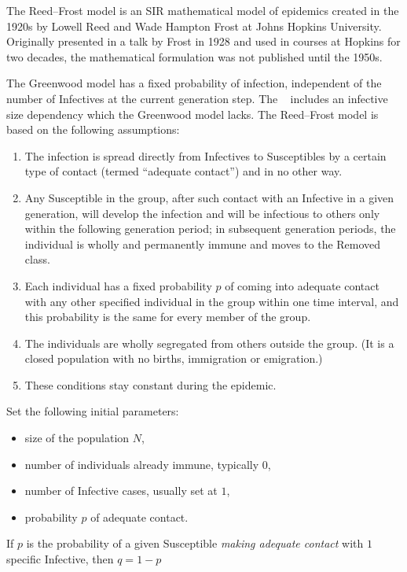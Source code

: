 \documentclass[12pt]{article}
\begin{document}
The Reed–Frost model is an SIR mathematical model of epidemics created
in the 1920s by Lowell Reed and Wade Hampton Frost at Johns Hopkins
University. Originally presented in a talk by Frost in 1928 and used in
courses at Hopkins for two decades, the mathematical formulation was not
published until the 1950s.

The Greenwood model has a fixed probability of infection, independent of
the number of Infectives at the current generation step.  The ~%
includes an infective size dependency which the Greenwood model lacks.
The Reed–Frost model is based on the following assumptions:
\begin{enumerate}
    \item
        The infection is spread directly from Infectives to Susceptibles
        by a certain type of contact (termed ``adequate contact'') and
        in no other way.
    \item
        Any Susceptible in the group, after such contact with an
        Infective in a given generation, will develop the infection and
        will be infectious to others only within the following
        generation period; in subsequent generation periods, the
        individual is wholly and permanently immune and moves to the
        Removed class.
    \item
        Each individual has a fixed probability \( p \) of coming into
        adequate contact with any other specified individual in the
        group within one time interval, and this probability is the same
        for every member of the group.
    \item
        The individuals are wholly segregated from others outside the
        group.  (It is a closed population with no births, immigration
        or emigration.)
    \item
        These conditions stay constant during the epidemic.
\end{enumerate}
Set the following initial parameters:
\begin{itemize}
    \item
        size of the population \( N \),
    \item
        number of individuals already immune, typically \( 0 \),
    \item
        number of Infective cases, usually set at \( 1 \),
    \item
        probability \( p \) of adequate contact.
\end{itemize}
If \( p \) is the probability of a given Susceptible \emph{making
adequate contact} with \( 1 \) specific Infective, then \( q = 1 - p \)
\end{document}
